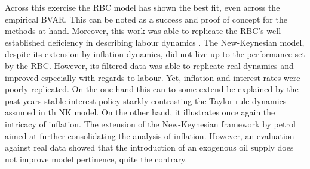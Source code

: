 \documentclass[12pt,a4paper,english]{article} %
\begin{document}
	Across this exercise the RBC model has shown the best fit, even across the empirical BVAR. This can be noted as a success and proof of concept for the methods at hand. Moreover, this work was able to replicate the RBC's well established deficiency in describing labour dynamics \cite{christiano_current_1992}. 
	The New-Keynesian model, despite its extension by inflation dynamics, did not live up to the performance set by the RBC. However, its filtered data was able to replicate real dynamics and improved especially with regards to labour. Yet, inflation and interest rates were poorly replicated. On the one hand this can to some extend be explained by the past years stable interest policy starkly contrasting the Taylor-rule dynamics assumed in th NK model. On the other hand, it illustrates once again the intricacy of inflation. 
	The extension of the New-Keynesian framework by petrol aimed at further consolidating the analysis of inflation. However, an evaluation against real data showed that the introduction of an exogenous oil supply does not improve model pertinence, quite the contrary.
	
\end{document}
